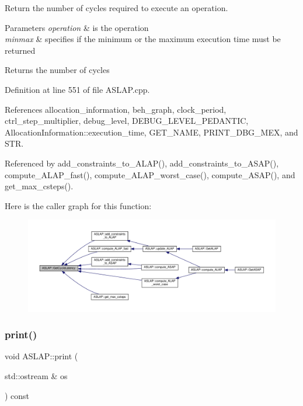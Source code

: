 Return the number of cycles required to execute an operation. 


\begin{DoxyParams}{Parameters}
{\em operation} & is the operation \\
\hline
{\em minmax} & specifies if the minimum or the maximum execution time must be returned \\
\hline
\end{DoxyParams}
\begin{DoxyReturn}{Returns}
the number of cycles 
\end{DoxyReturn}


Definition at line 551 of file A\+S\+L\+A\+P.\+cpp.



References allocation\+\_\+information, beh\+\_\+graph, clock\+\_\+period, ctrl\+\_\+step\+\_\+multiplier, debug\+\_\+level, D\+E\+B\+U\+G\+\_\+\+L\+E\+V\+E\+L\+\_\+\+P\+E\+D\+A\+N\+T\+IC, Allocation\+Information\+::execution\+\_\+time, G\+E\+T\+\_\+\+N\+A\+ME, P\+R\+I\+N\+T\+\_\+\+D\+B\+G\+\_\+\+M\+EX, and S\+TR.



Referenced by add\+\_\+constraints\+\_\+to\+\_\+\+A\+L\+A\+P(), add\+\_\+constraints\+\_\+to\+\_\+\+A\+S\+A\+P(), compute\+\_\+\+A\+L\+A\+P\+\_\+fast(), compute\+\_\+\+A\+L\+A\+P\+\_\+worst\+\_\+case(), compute\+\_\+\+A\+S\+A\+P(), and get\+\_\+max\+\_\+csteps().

Here is the caller graph for this function\+:
\nopagebreak
\begin{figure}[H]
\begin{center}
\leavevmode
\includegraphics[width=350pt]{d9/d2a/classASLAP_a2d74ef008a1dd3b6bb59673afe419fac_icgraph}
\end{center}
\end{figure}
\mbox{\label{classASLAP_a19d19a74b5b0d8d0aec0107b4b1cc656}} 
\subsubsection{\texorpdfstring{print()}{print()}}
{\footnotesize\ttfamily void A\+S\+L\+A\+P\+::print (\begin{DoxyParamCaption}\item[{std\+::ostream \&}]{os }\end{DoxyParamCaption}) const}



